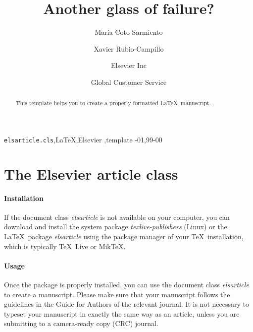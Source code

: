 \documentclass[review]{elsarticle}
\begin{document}
\begin{frontmatter}

\title{Another glass of failure? }

\author{Mar\'ia Coto-Sarmiento}
\author{Xavier Rubio-Campillo}
\address{Radarweg 29, Amsterdam}

\author[mymainaddress,mysecondaryaddress]{Elsevier Inc}

\author[mysecondaryaddress]{Global Customer Service}

\address[mymainaddress]{1600 John F Kennedy Boulevard, Philadelphia}
\address[mysecondaryaddress]{360 Park Avenue South, New York}

\begin{abstract}
This template helps you to create a properly formatted \LaTeX\ manuscript.
\end{abstract}

\begin{keyword}
\texttt{elsarticle.cls}\sep \LaTeX\sep Elsevier \sep template
-01\sep  99-00
\end{keyword}

\end{frontmatter}

\linenumbers

\section{The Elsevier article class}

\paragraph{Installation} If the document class \emph{elsarticle} is not available on your computer, you can download and install the system package \emph{texlive-publishers} (Linux) or the \LaTeX\ package \emph{elsarticle} using the package manager of your \TeX\ installation, which is typically \TeX\ Live or Mik\TeX.

\paragraph{Usage} Once the package is properly installed, you can use the document class \emph{elsarticle} to create a manuscript. Please make sure that your manuscript follows the guidelines in the Guide for Authors of the relevant journal. It is not necessary to typeset your manuscript in exactly the same way as an article, unless you are submitting to a camera-ready copy (CRC) journal.
\end{document}
